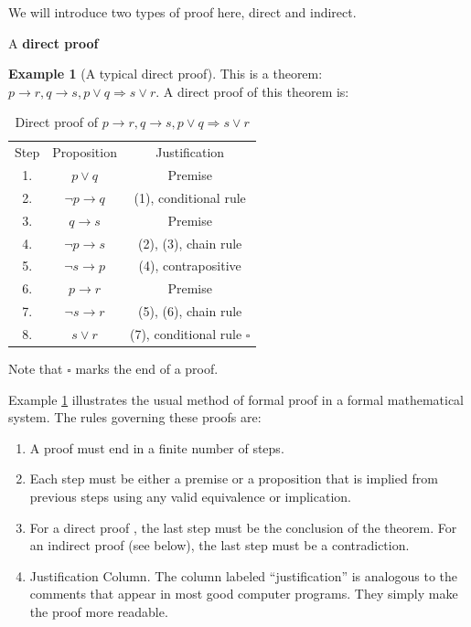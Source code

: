 \documentclass[10pt,]{book}
\newcommand{\terminology}[1]{\textbf{#1}}
\theoremstyle{plain}
\theoremstyle{definition}
\theoremstyle{definition}
\theoremstyle{definition}
\newtheorem{example}[theorem]{Example}
\theoremstyle{definition}
\begin{document}
\par
We will introduce two types of proof here, direct and indirect.%
\par
A \terminology{direct proof}%
\begin{example}[A typical direct proof]\label{proof-3-5-1}
 This is a theorem: \(p \rightarrow  r, q\rightarrow s,p\lor q\Rightarrow s\lor r\).   A direct proof of this theorem is:%
\leavevmode%
\begin{table}
\centering
\begin{tabular}{ccc}
Step&Proposition & Justification\tabularnewline[0pt]
1.&\(p \lor  q\)& Premise\tabularnewline[0pt]
2.&\(\neg p \rightarrow  q\)&  (1), conditional rule\tabularnewline[0pt]
3.&\(q \rightarrow  s\)& Premise\tabularnewline[0pt]
4.&\(\neg p \rightarrow  s\)&  (2), (3), chain rule\tabularnewline[0pt]
5.&\(\neg s \rightarrow p\)&  (4), contrapositive\tabularnewline[0pt]
6.&\(p \rightarrow  r\)&  Premise\tabularnewline[0pt]
7.&\(\neg s \rightarrow  r\)& (5), (6), chain rule\tabularnewline[0pt]
8.&\(s \lor r\)& (7), conditional rule   \(\square\)
\end{tabular}
\caption{Direct proof of \(p \rightarrow  r, q\rightarrow s,p\lor q\Rightarrow s\lor r\)\label{proof-steps-1}}
\end{table}
\end{example}
\par
Note that \(\square\) marks the end of a proof.%
\par
Example \hyperref[proof-3-5-1]{\ref{proof-3-5-1}} illustrates the usual method of formal proof in a formal mathematical system. The rules governing these proofs are:%
\par
\leavevmode%
\begin{enumerate}[label=\arabic*]
\item\hypertarget{li-109}{}A proof must end in a finite number of steps.%
\item\hypertarget{li-110}{}Each step must be either a premise or a proposition that is implied from previous steps using any valid equivalence or implication.%
\item\hypertarget{li-111}{}For a direct proof , the last step must be the conclusion of the theorem. For an indirect proof (see below), the last step must be a contradiction.%
\item\hypertarget{li-112}{} Justification Column. The column labeled ``justification'' is analogous to the comments that appear in most good computer programs. They simply make the proof more readable.%
\end{enumerate}
\end{document}
